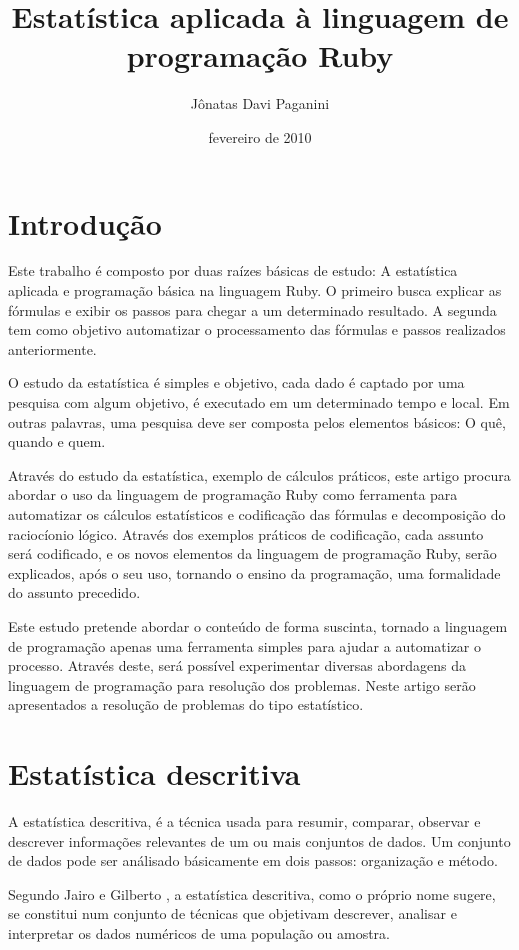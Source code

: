 \documentclass[espaco=simples,appendix=Name]{abnt}
\title{Estatística aplicada à linguagem de programação Ruby}
\author{Jônatas Davi Paganini}
\date{fevereiro de 2010}
\begin{document}
\maketitle

\chapter{Introdução}


Este trabalho é composto por duas raízes básicas de estudo: A estatística aplicada e programação básica na linguagem Ruby. O primeiro busca explicar as fórmulas e exibir os passos para chegar a um determinado resultado. A segunda tem como objetivo automatizar o processamento das fórmulas e passos realizados anteriormente.

O estudo da estatística é simples e objetivo, cada dado é captado por uma pesquisa com algum objetivo, é executado em um determinado tempo e local. Em outras palavras, uma pesquisa deve ser composta pelos elementos básicos: O quê, quando e quem.

Através do estudo da estatística, exemplo de cálculos práticos, este artigo procura abordar o uso da linguagem de programação Ruby como ferramenta para automatizar os cálculos estatísticos e codificação das fórmulas e decomposição do raciocíonio lógico. Através dos exemplos práticos de codificação, cada assunto será codificado, e os novos elementos da linguagem de programação Ruby, serão explicados, após o seu uso, tornando o ensino da programação, uma formalidade do assunto precedido.

Este estudo pretende abordar o conteúdo de forma suscinta, tornado a linguagem de programação apenas uma ferramenta simples para ajudar a automatizar o processo. Através deste, será possível experimentar diversas abordagens da linguagem de programação para resolução dos problemas. Neste artigo serão apresentados a resolução de problemas do tipo estatístico.


\chapter{Estatística descritiva}

A estatística descritiva, é a técnica usada para resumir, comparar, observar e descrever informações relevantes de um ou mais conjuntos de dados. Um conjunto de dados pode ser análisado básicamente em dois passos: organização e método.

Segundo Jairo e Gilberto \cite{cursoEstatistica}, a estatística descritiva, como o próprio nome sugere, se constitui num conjunto de técnicas que objetivam descrever, analisar e interpretar os dados numéricos de uma população ou amostra.
\end{document}

